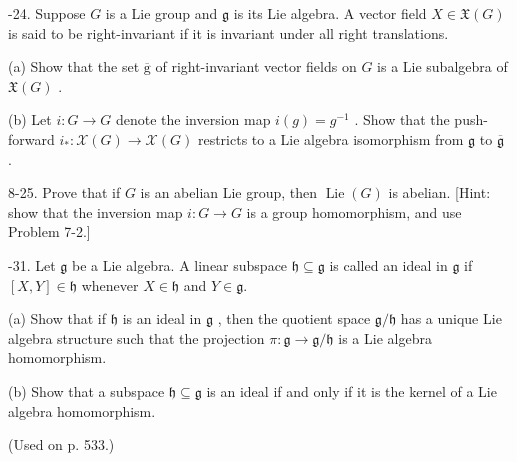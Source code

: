 \begin{exercise}
\label{prob:8-24}
-24. Suppose $G$ is a Lie group and $\mathfrak{g}$ is its Lie algebra. A vector field $X \in  \mathfrak{X}\left( G\right)$ is said to be right-invariant if it is invariant under all right translations.

(a) Show that the set $\overline{\mathrm{g}}$ of right-invariant vector fields on $G$ is a Lie subalgebra of $\mathfrak{X}\left( G\right)$ .

(b) Let $i : G \rightarrow  G$ denote the inversion map $i\left( g\right)  = {g}^{-1}$ . Show that the push-forward ${i}_{ * } : \mathcal{X}\left( G\right)  \rightarrow  \mathcal{X}\left( G\right)$ restricts to a Lie algebra isomorphism from $\mathfrak{g}$ to $\overline{\mathfrak{g}}$ .
\end{exercise}

\begin{exercise}
\label{prob:8-25}
\leanok
{}
8-25. Prove that if $G$ is an abelian Lie group, then $\operatorname{Lie}\left( G\right)$ is abelian. [Hint: show that the inversion map $i : G \rightarrow  G$ is a group homomorphism, and use Problem 7-2.]
\end{exercise}

\begin{exercise}
\label{prob:8-31}
-31. Let $\mathfrak{g}$ be a Lie algebra. A linear subspace $\mathfrak{h} \subseteq  \mathfrak{g}$ is called an ideal in $\mathfrak{g}$ if $\left\lbrack  {X, Y}\right\rbrack   \in  \mathfrak{h}$ whenever $X \in  \mathfrak{h}$ and $Y \in  \mathfrak{g}.$

(a) Show that if $\mathfrak{h}$ is an ideal in $\mathfrak{g}$ , then the quotient space $\mathfrak{g}/\mathfrak{h}$ has a unique Lie algebra structure such that the projection $\pi  : \mathfrak{g} \rightarrow  \mathfrak{g}/\mathfrak{h}$ is a Lie algebra homomorphism.

(b) Show that a subspace $\mathfrak{h} \subseteq  \mathfrak{g}$ is an ideal if and only if it is the kernel of a Lie algebra homomorphism.

(Used on p. 533.)
\end{exercise}

